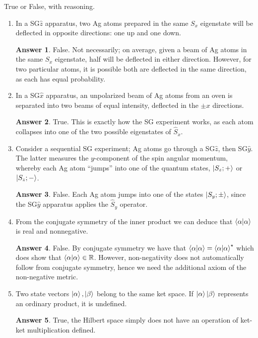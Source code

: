 \documentclass[12pt]{article}
\newenvironment{problem}[2][Problem]{\begin{trivlist}
    \item[\hskip \labelsep {\bfseries #1}\hskip \labelsep {\bfseries #2.}]}{\end{trivlist}}
\theoremstyle{definition}
\newtheorem*{answer}{Answer}
\begin{document}
\begin{problem}{2}
  True or False, with reasoning.
  \begin{enumerate}[label=(\alph*)]
    \item In a SG\( \hat{z} \) apparatus, two Ag atoms prepared in the same \( S_x \) eigenstate will be deflected in opposite directions: one up and one down.
          \begin{answer}
            False. Not necessarily; on average, given a beam of Ag atoms in the same \( S_x \) eigenstate, half will be deflected in either direction. However, for two particular atoms, it is possible both are deflected in the same direction, as each has equal probability.
          \end{answer}
    \item In a SG\( \hat{x} \) apparatus, an unpolarized beam of Ag atoms from an oven is separated into two beams of equal intensity, deflected in the \( \pm x \) directions.
          \begin{answer}
            True. This is exactly how the SG experiment works, as each atom collapses into one of the two possible eigenstates of \( \hat{S}_x \).
          \end{answer}
    \item Consider a sequential SG experiment; Ag atoms go through a SG\( \hat{z} \), then SG\( \hat{y} \). The latter measures the \( y \)-component of the spin angular momentum, whereby each Ag atom ``jumps'' into one of the quantum states, \( \ket{S_z; +} \) or \( \ket{S_z; -} \).
          \begin{answer}
            False. Each Ag atom jumps into one of the states \( \ket{S_y; \pm} \), since the SG\( \hat{y} \) apparatus applies the \( \hat{S}_y \) operator.
          \end{answer}
    \item From the conjugate symmetry of the inner product we can deduce that \( \braket{\alpha} \) is real and nonnegative.
          \begin{answer}
            False. By conjugate symmetry we have that \( \ip{\alpha} = \ip{\alpha}^{\star} \) which does show that \( \ip{\alpha} \in \mathbb{R} \). However, non-negativity does not automatically follow from conjugate symmetry, hence we need the additional axiom of the non-negative metric.
          \end{answer}
    \item Two state vectors \( \ket{\alpha}, \ket{\beta} \) belong to the same ket space. If \( \ket{\alpha}\ket{\beta} \) represents an ordinary product, it is undefined.
          \begin{answer}
            True, the Hilbert space simply does not have an operation of ket-ket multiplication defined.
          \end{answer}
  \end{enumerate}
\end{problem}
\end{document}
